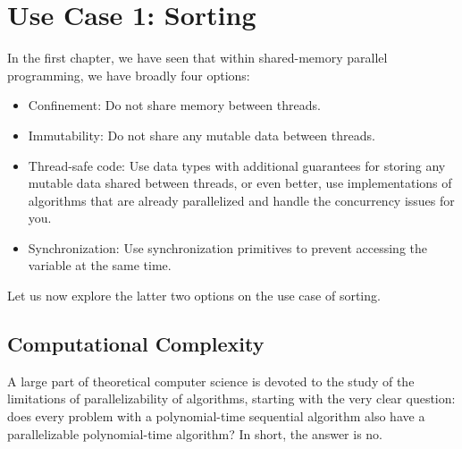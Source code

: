 \chapter{Use Case 1: Sorting}

In the first chapter, we have seen that within shared-memory parallel programming, we have broadly four options:
\begin{itemize}
\item Confinement: Do not share memory between threads. 
\item Immutability: Do not share any mutable data between threads. 
\item Thread-safe code: Use data types with additional guarantees for storing any mutable data shared between threads, or even better, use implementations of algorithms that are already parallelized and handle the concurrency issues for you. 
\item Synchronization: Use synchronization primitives to prevent accessing the variable at the same time. 
\end{itemize}

Let us now explore the latter two options on the use case of sorting. 

\section{Computational Complexity}

A large part of theoretical computer science is devoted to the study of the limitations of parallelizability of algorithms, starting with the very clear question: does every problem 
with a polynomial-time sequential algorithm also have a parallelizable polynomial-time algorithm? In short, the answer is no. 


